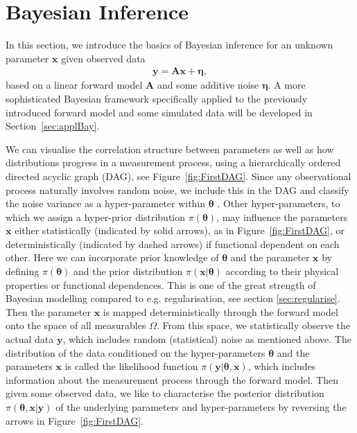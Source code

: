 \section{Bayesian Inference}
\label{sec:bayes}
In this section, we introduce the basics of Bayesian inference for an unknown parameter $\bm{x}$ given observed data
\begin{align}
	\bm{y} = \bm{A} \bm{x} + \bm{\eta},
	\label{eq:LinDat}
\end{align}
based on a linear forward model $\bm{A}$ and some additive noise $\bm{\eta}$.
A more sophisticated Bayesian framework specifically applied to the previously introduced forward model and some simulated data will be developed in Section~\ref{sec:applBay}.


We can visualise the correlation structure between parameters as well as how distributions progress in a measurement process, using a hierarchically ordered directed acyclic graph (DAG), see Figure~\ref{fig:FirstDAG}.
Since any observational process naturally involves random noise, we include this in the DAG and classify the noise variance as a hyper-parameter within $\bm{\theta}$ \cite{fox2016fast}.  
Other hyper-parameters, to which we assign a hyper-prior distribution $\pi(\bm{\theta})$, may influence the parameters $\bm{x}$ either statistically (indicated by solid arrows), as in Figure~\ref{fig:FirstDAG}, or deterministically (indicated by dashed arrows) if functional dependent on each other.
Here we can incorporate prior knowledge of $\bm{\theta}$ and the parameter $\bm{x}$ by defining $\pi(\bm{\theta})$ and the prior distribution $\pi(\bm{x}|\bm{\theta})$ according to their physical properties or functional dependences.
This is one of the great strength of Bayesian modelling compared to e.g. regularisation, see section \ref{sec:regularise}.
Then the parameter $\bm{x}$ is mapped deterministically through the forward model onto the space of all measurables $\Omega$. From this space, we statistically observe the actual data $\bm{y}$, which includes random (statistical) noise as mentioned above.
The distribution of the data conditioned on the  hyper-parameters $\bm{\theta}$ and the parameters $\bm{x}$ is called the likelihood function $\pi(\bm{y}|\bm{\theta},\bm{x})$, which includes information about the measurement process through the forward model.
Then given some observed data, we like to characterise the posterior distribution $\pi(\bm{\theta}, \bm{x}|\bm{y})$ of the underlying parameters and hyper-parameters by reversing the arrows in Figure~\ref{fig:FirstDAG}. 
